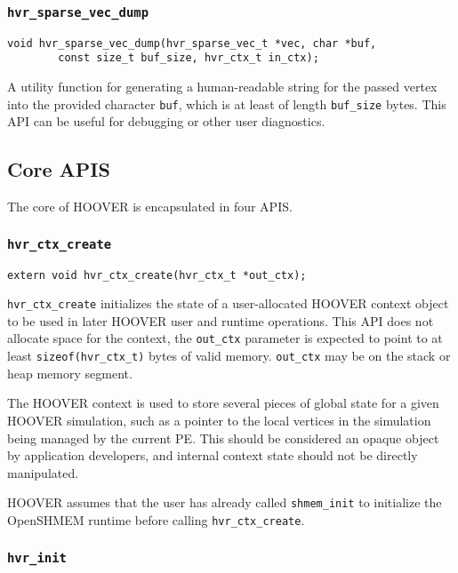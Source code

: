 \subsubsection{\texttt{hvr\_sparse\_vec\_dump}}

\begin{verbatim}
void hvr_sparse_vec_dump(hvr_sparse_vec_t *vec, char *buf,
        const size_t buf_size, hvr_ctx_t in_ctx);
\end{verbatim}

A utility function for generating a human-readable string for the passed vertex
into the provided character \texttt{buf}, which is at least of length
\texttt{buf\_size} bytes. This API can be useful for debugging or other user
diagnostics.

\subsection{Core APIS}

The core of HOOVER is encapsulated in four APIS.

\subsubsection{\texttt{hvr\_ctx\_create}}

\begin{verbatim}
extern void hvr_ctx_create(hvr_ctx_t *out_ctx);
\end{verbatim}

\texttt{hvr\_ctx\_create} initializes the state of a user-allocated HOOVER
context object to be used in later HOOVER user and runtime operations. This API
does not allocate space for the context, the \texttt{out\_ctx} parameter is
expected to point to at least \texttt{sizeof(hvr\_ctx\_t)} bytes of valid
memory. \texttt{out\_ctx} may be on the stack or heap memory segment.

The HOOVER context is used to store several pieces of global state for a given HOOVER
simulation, such as a pointer to the local vertices in the simulation being
managed by the current PE. This should be considered an opaque object by
application developers, and internal context state should not be directly
manipulated.

HOOVER assumes that the user has already called \texttt{shmem\_init} to
initialize the OpenSHMEM runtime before calling \texttt{hvr\_ctx\_create}.

\subsubsection{\texttt{hvr\_init}}

